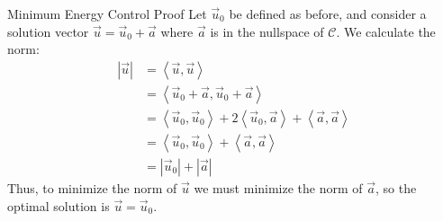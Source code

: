 \begin{frame}{Minimum Energy Control Proof}
	Let $\vec{u}_0$ be defined as before, and consider a solution vector $\vec{u} = \vec{u}_0 + \vec{a}$ where $\vec{a}$ is in the nullspace of $\mathcal{C}$. We calculate the norm:
	\begin{align*}
	\left| \vec{u} \right| 
	& = \left< \vec{u}, \vec{u} \right> 
	\\ &= \left< \vec{u}_0 + \vec{a}, \vec{u}_0 + \vec{a} \right> 
	\\ &= \left< \vec{u}_0, \vec{u}_0 \right>  + 2\left< \vec{u}_0, \vec{a} \right>  + \left< \vec{a}, \vec{a} \right> 
	\\ &= \left< \vec{u}_0, \vec{u}_0 \right>  + \left< \vec{a}, \vec{a} \right> 
	\\ &= \left| \vec{u}_0 \right| + \left| \vec{a} \right| 
	\end{align*}
	Thus, to minimize the norm of $\vec{u}$ we must minimize the norm of $\vec{a}$, so the optimal solution is $\vec{u} = \vec{u}_0$.
\end{frame}